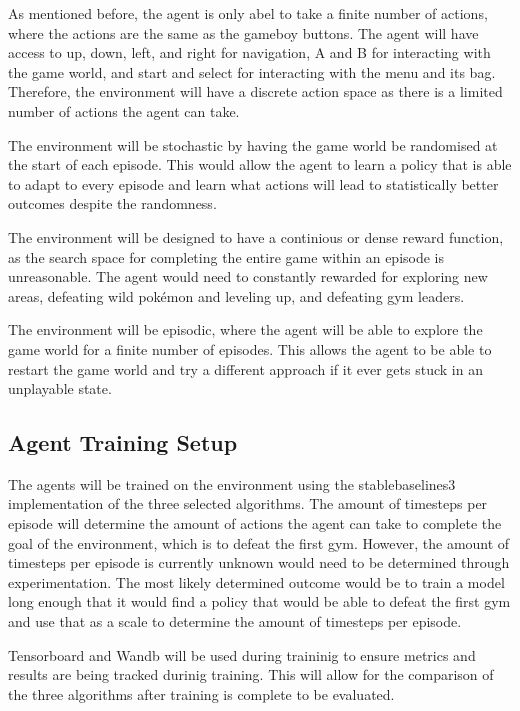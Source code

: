 As mentioned before, the agent is only abel to take a finite number of actions, where the actions are the same as the gameboy buttons. The agent will have access to up, down, left, and right for navigation, A and B for interacting with the game world, and start and select for interacting with the menu and its bag. Therefore, the environment will have a discrete action space as there is a limited number of actions the agent can take. 

The environment will be stochastic by having the game world be randomised at the start of each episode. This would allow the agent to learn a policy that is able to adapt to every episode and learn what actions will lead to statistically better outcomes despite the randomness.

The environment will be designed to have a continious or dense reward function, as the search space for completing the entire game within an episode is unreasonable. The agent would need to constantly rewarded for exploring new areas, defeating wild pokémon and leveling up, and defeating gym leaders. 

The environment will be episodic, where the agent will be able to explore the game world for a finite number of episodes. This allows the agent to be able to restart the game world and try a different approach if it ever gets stuck in an unplayable state.

\subsection{Agent Training Setup}

The agents will be trained on the environment using the stablebaselines3 implementation of the three selected algorithms. The amount of timesteps per episode will determine the amount of actions the agent can take to complete the goal of the environment, which is to defeat the first gym. However, the amount of timesteps per episode is currently unknown would need to be determined through experimentation. The most likely determined outcome would be to train a model long enough that it would find a policy that would be able to defeat the first gym and use that as a scale to determine the amount of timesteps per episode. 

Tensorboard and Wandb will be used during traininig to ensure metrics and results are being tracked durinig training. This will allow for the comparison of the three algorithms after training is complete to be evaluated. 

